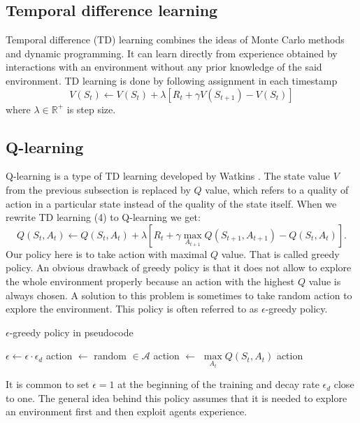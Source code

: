 \subsection{Temporal difference learning}
Temporal difference (TD) learning combines the ideas of Monte Carlo methods and dynamic programming. It can learn directly from experience obtained by interactions with an environment without any prior knowledge of the said environment. TD learning is done by following assignment in each timestamp \cite{sutton2012}
\begin{equation}
V(S_t) \gets V(S_t) + \lambda [R_{t} + \gamma V(S_{t+1}) - V(S_t)]
\end{equation}
where $\lambda \in \mathbb{R}^+$ is step size.

\subsection{Q-learning}
Q-learning is a type of TD learning developed by Watkins \cite{watkins1992}. The state value $V$ from the previous subsection is replaced by $Q$ value, which refers to a quality of action in a particular state instead of the quality of the state itself. When we rewrite TD learning (4) to Q-learning we get:
\begin{equation}
Q(S_t, A_t) \gets Q(S_t, A_t) + \lambda [R_{t} + \gamma \underset{A_{t+1}}{\max} Q(S_{t+1}, A_{t+1}) - Q(S_t, A_t)].
\end{equation}
Our policy here is to take action with maximal $Q$ value. That is called greedy policy. An obvious drawback of greedy policy is that it does not allow to explore the whole environment properly because an action with the highest $Q$ value is always chosen. A solution to this problem is sometimes to take random action to explore the environment. This policy is often referred to as $\epsilon$-greedy policy.

\begin{algorithm}
\caption{$\epsilon$-greedy policy in pseudocode}
\begin{algorithmic}[1]
\State $\epsilon \gets \epsilon \cdot \epsilon_d$
\State action $\gets$ random $\in \mathcal{A}$
\Else 
\State action $\gets$ $\underset{A_t}{\max} Q(S_t, A_t)$
\EndIf
\State \Return action
\EndFunction
\end{algorithmic}
\end{algorithm}

It is common to set $\epsilon = 1$ at the beginning of the training and decay rate $\epsilon_d$ close to one. The general idea behind this policy assumes that it is needed to explore an environment first and then exploit agents experience.


